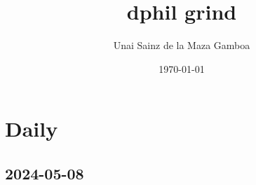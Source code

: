\documentclass[a4paper, 11pt]{article}
\title{dphil grind}
\author{Unai Sainz de la Maza Gamboa}
\date{\today}
\begin{document}
\maketitle
\tableofcontents

\section{Daily}
\subsection{2024-05-08}


\cleardoublepage



\end{document}

